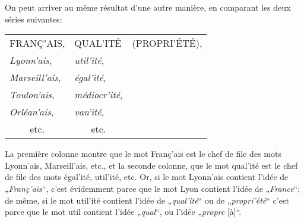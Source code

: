 {      On peut arriver au même résultat d’une autre manière, en
      comparant les deux séries suivantes:

      \begin{center}
        \begin{tabular}[t]{ll@{ }l}
          FRANÇ'AIS, & QUAL'ITÉ & (PROPRI'ÉTÉ),\\
          \emph{Lyonn'ais}, & \emph{util'ité},\\
          \emph{Marseill'ais},  & \emph{égal'ité},\\
          \emph{Toulon'ais},  & \emph{médiocr'ité},\\
          \emph{Orléan'ais},  & \emph{van'ité},\\
          \multicolumn{1}{c}{etc.}  & \multicolumn{1}{c}{etc.}.
        \end{tabular}
      \end{center}

      La première colonne montre que le mot \textup{Franç'ais} est le
      chef de file des mots \textup{Lyonn'ais}, \textup{Marseill'ais},
      etc., et la seconde colonne, que le mot \textup{qual'ité} est le
      chef de file des mots \textup{égal'ité}, \textup{util'ité},
      etc. Or, si le mot \textup{Lyonn'ais} contient l’idée de
      „\emph{Franç'ais}“, c’est évidemment parce que le mot
      \textup{Lyon} contient l’idée de „\emph{France}“; de même, si
      le mot \textup{util'ité} contient l’idée de „\emph{qual'ité}“ ou
      de „\emph{propri'été}“ c’est parce que le mot \textup{util}
      contient l’idée „\emph{qual}“, ou l’idée „\emph{propre} [à]“.   

  }
  
